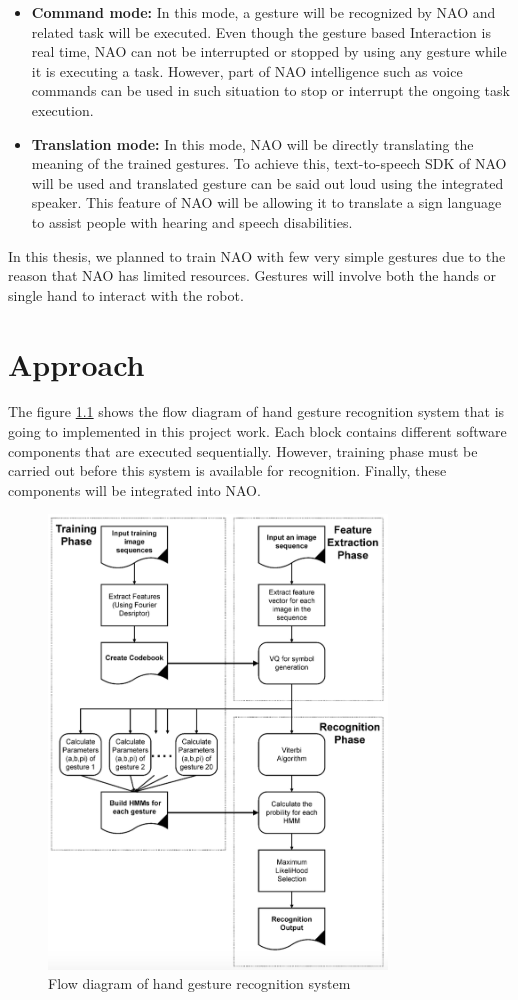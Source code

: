 \begin{itemize}
	\item \textbf{Command mode:} In this mode, a gesture will be recognized by NAO and related task will be executed. Even though the gesture based Interaction is real time, NAO can not be interrupted or stopped by using any gesture while it is executing a task. However, part of NAO intelligence such as voice commands can be used in such situation to stop or interrupt the ongoing task execution.
	\item \textbf{Translation mode:} In this mode, NAO will be directly translating the meaning of the trained gestures. To achieve this, text-to-speech SDK of NAO will be used and translated gesture can be said out loud using the integrated speaker. This feature of NAO will be allowing it to translate a sign language to assist people with hearing and speech disabilities.
\end{itemize}

In this thesis, we planned to train NAO with few very simple gestures due to the reason that NAO has limited resources. Gestures will involve both the hands or single hand to interact with the robot.

\chapter{Approach} The figure \ref{fig:flow} shows the flow diagram of hand gesture recognition system that is going to implemented in this project work. Each block contains different software components that are executed sequentially. However, training phase must be carried out before this system is available for recognition. Finally, these components will be integrated into NAO.

\begin{figure}
	[!h] \centering 
	\includegraphics[width=9cm]{figures/flow.png} \caption{Flow diagram of hand gesture recognition system} \label{fig:flow} 
\end{figure}

